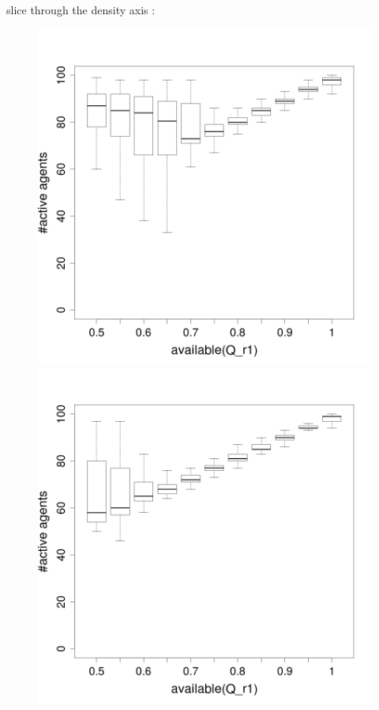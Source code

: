 \documentclass[8pt, handout=show,notes=show]{beamer}
\begin{document}
\begin{frame}{ slice through the density axis : }
\begin{figure}[H]
\includegraphics[width=\imgSize]{images/alive_r1_density-2.png}
\includegraphics[width=\imgSize]{images/alive_r1_density-8.png}\\

\end{figure}
\end{frame}
\end{document}
